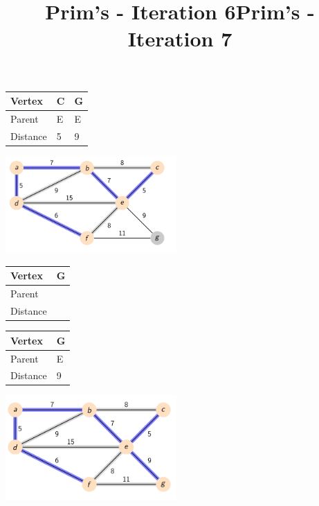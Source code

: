 \documentclass{beamer}
\begin{document}
\begin{frame}[fragile]
    \title{Prim's - Iteration 6}
    \centering
    \begin{table}[]
        \begin{tabular}{|l|l|l|}
            \hline
            Vertex   & C & G \\ \hline
            Parent   & E & E \\ \hline
            Distance & 5 & 9 \\ \hline
        \end{tabular}
    \end{table}
    \includegraphics[width=0.49\textwidth]{./imgs/prims_walkthrough/prims6.png}
    \begin{table}[]
        \begin{tabular}{|l|l|}
            \hline
            Vertex   & G \\ \hline
            Parent   &  \\ \hline
            Distance &  \\ \hline
        \end{tabular}
    \end{table}

\end{frame}

\begin{frame}[fragile]
    \title{Prim's - Iteration 7}
    \centering
    \begin{table}[]
        \begin{tabular}{|l|l|}
            \hline
            Vertex   & G \\ \hline
            Parent   & E \\ \hline
            Distance & 9 \\ \hline
        \end{tabular}
    \end{table}
    \includegraphics[width=0.49\textwidth]{./imgs/prims_walkthrough/prims7.png}

\end{frame}
\end{document}
